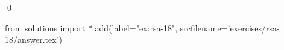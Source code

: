 
\begin{ex} 
  \label{ex:rsa-18}
  
  \qed
\end{ex} 
\begin{python0}
from solutions import *
add(label="ex:rsa-18",
    srcfilename='exercises/rsa-18/answer.tex') 
\end{python0}
